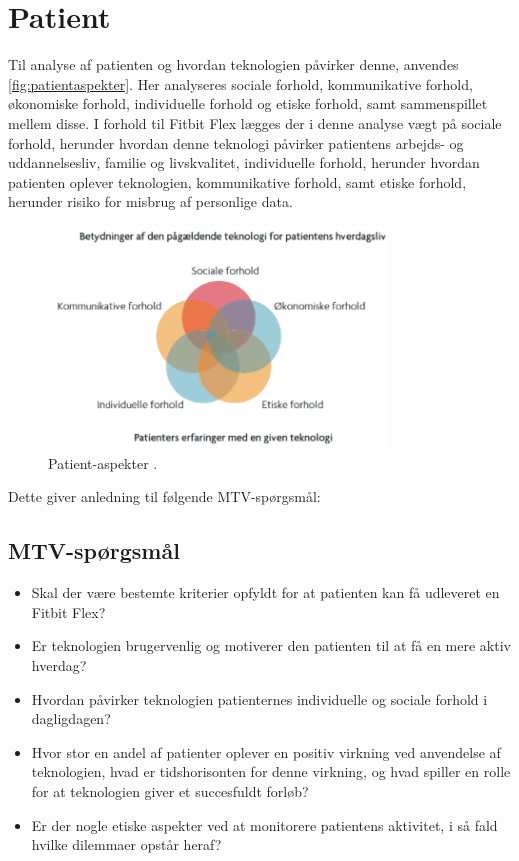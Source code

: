\section{Patient}\label{sec:metode_pat}
Til analyse af patienten og hvordan teknologien påvirker denne, anvendes \autoref{fig:patientaspekter}. Her analyseres sociale forhold, kommunikative forhold, økonomiske forhold, individuelle forhold og etiske forhold, samt sammenspillet mellem disse. I forhold til Fitbit Flex lægges der i denne analyse vægt på sociale forhold, herunder hvordan denne teknologi påvirker patientens arbejds- og uddannelsesliv, familie og livskvalitet, individuelle forhold, herunder hvordan patienten oplever teknologien, kommunikative forhold, samt etiske forhold, herunder risiko for misbrug af personlige data. 


\begin{figure}[H]
\centering
\includegraphics[width=0.8\textwidth]{figures/patientaspekter}
\caption{Patient-aspekter \citep{mtvhaandbog}.}
\label{fig:patientaspekter}
\end{figure}

\noindent
Dette giver anledning til følgende MTV-spørgsmål: 

\subsection{MTV-spørgsmål}
\begin{itemize}
\item Skal der være bestemte kriterier opfyldt for at patienten kan få udleveret en Fitbit Flex?
\item Er teknologien brugervenlig og motiverer den patienten til at få en mere aktiv hverdag?
\item Hvordan påvirker teknologien patienternes individuelle og sociale forhold i dagligdagen?
\item Hvor stor en andel af patienter oplever en positiv virkning ved anvendelse af teknologien, hvad er tidshorisonten for denne virkning, og hvad spiller en rolle for at teknologien giver et succesfuldt forløb?
\item Er der nogle etiske aspekter ved at monitorere patientens aktivitet, i så fald hvilke dilemmaer opstår heraf?
\end{itemize} 

